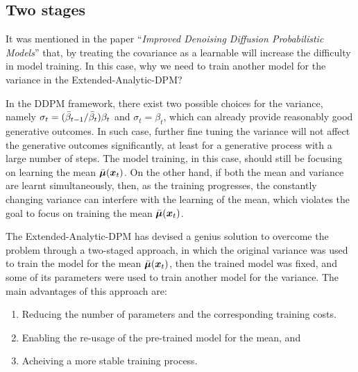 \subsection{Two stages}
It was mentioned in the paper ``\emph{Improved Denoising Diffusion Probabilistic Models}''\cite{nichol2021improved} that, by treating the covariance as a learnable will increase the difficulty in model training. In this case, why we need to train another model for the variance in the Extended-Analytic-DPM? 

In the DDPM framework, there exist two possible choices for the variance, namely $\sigma_t=(\bar{\beta}_{t-1}/\bar{\beta}_t)\beta_t$ and $\sigma_t=\beta_t$, which can already provide reasonably good generative outcomes. In such case, further fine tuning the variance will not affect the generative outcomes significantly, at least for a generative process with a large number of steps. The model training, in this case, should still be focusing on learning the mean $\bar{\bm{\mu}}(\bm{x}_{t})$. On the other hand, if both the mean and variance are learnt simultaneously, then, as the training progresses, the constantly changing variance can interfere with the learning of the mean, which violates the goal to focus on training the mean $\bar{\bm{\mu}}(\bm{x}_{t})$.

The Extended-Analytic-DPM has devised a genius solution to overcome the problem through a two-staged approach, in which the original variance was used to train the model for the mean $\bar{\bm{\mu}}(\bm{x}_{t})$, then the trained model was fixed, and some of its parameters were used to train another model for the variance. The main advantages of this approach are:
\begin{enumerate}
    \item Reducing the number of parameters and the corresponding training costs.
    \item Enabling the re-usage of the pre-trained model for the mean, and
    \item Acheiving a more stable training process.
\end{enumerate}
